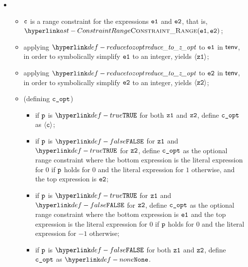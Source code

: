 \begin{itemize}
  \item {}
  \begin{itemize}
    \item $\texttt{c}$ is a range constraint for the expressions $\texttt{e1}$ and $\texttt{e2}$, that is, \\
          $\ConstraintRange(\veone, \vetwo)$;
    \item applying $\reducetozopt$ to $\texttt{e1}$ in $\textsf{tenv}$, in order to symbolically simplify $\texttt{e1}$ to an integer,
          yields $\langle\texttt{z1}\rangle$;
    \item applying $\reducetozopt$ to $\texttt{e2}$ in $\textsf{tenv}$, in order to symbolically simplify $\texttt{e2}$ to an integer,
          yields $\langle\texttt{z2}\rangle$;
    \item \OneApplies{} (defining $\texttt{c\_opt}$)
    \begin{itemize}
      \item if $\texttt{p}$ is $\True$ for both $\texttt{z1}$ and $\texttt{z2}$, define $\texttt{c\_opt}$ as $\langle\texttt{c}\rangle$;
      \item if $\texttt{p}$ is $\False$ for $\texttt{z1}$ and $\True$ for $\texttt{z2}$, define $\texttt{c\_opt}$ as the optional range constraint
            where the bottom expression is the literal expression for $0$ if $\texttt{p}$ holds for $0$ and the literal expression for $1$ otherwise,
            and the top expression is $\texttt{e2}$;
      \item if $\texttt{p}$ is $\True$ for $\texttt{z1}$ and $\False$ for $\texttt{z2}$, define $\texttt{c\_opt}$ as the optional range constraint
            where the bottom expression is $\texttt{e1}$ and the top expression is the literal expression for $0$ if $\texttt{p}$ holds for $0$
            and the literal expression for $-1$ otherwise;
      \item if $\texttt{p}$ is $\False$ for both $\texttt{z1}$ and $\texttt{z2}$, define $\texttt{c\_opt}$ as $\None$.
    \end{itemize}
  \end{itemize}


\end{itemize}
